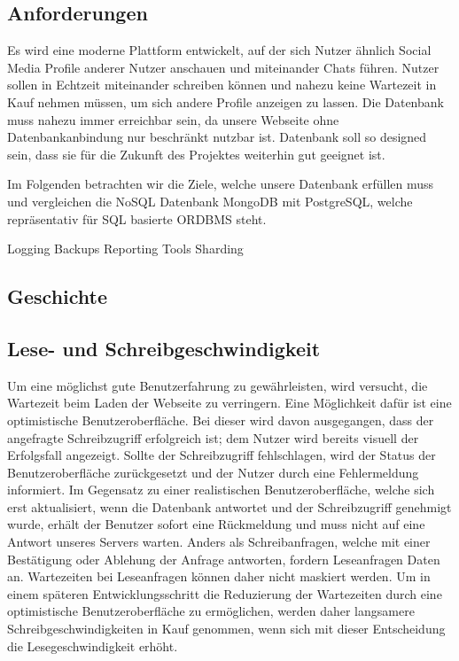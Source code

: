 \subsection{Anforderungen}
Es wird eine moderne Plattform entwickelt, auf der sich Nutzer ähnlich Social Media Profile anderer Nutzer anschauen und miteinander Chats führen. Nutzer sollen in Echtzeit miteinander schreiben können und nahezu keine Wartezeit in Kauf nehmen müssen, um sich andere Profile anzeigen zu lassen. Die Datenbank muss nahezu immer erreichbar sein, da unsere Webseite ohne Datenbankanbindung nur beschränkt nutzbar ist.
Datenbank soll so designed sein, dass sie für die Zukunft des Projektes weiterhin gut geeignet ist.


Im Folgenden betrachten wir die Ziele, welche unsere Datenbank erfüllen muss und vergleichen die NoSQL Datenbank MongoDB mit PostgreSQL, welche repräsentativ für SQL basierte ORDBMS steht.

Logging
Backups
Reporting Tools
Sharding

\subsection{Geschichte}

\subsection{Lese- und Schreibgeschwindigkeit}
Um eine möglichst gute Benutzerfahrung zu gewährleisten, wird versucht, die Wartezeit beim Laden der Webseite zu verringern. 
Eine Möglichkeit dafür ist eine optimistische Benutzeroberfläche. Bei dieser wird davon ausgegangen, dass der angefragte Schreibzugriff erfolgreich ist; dem Nutzer wird bereits visuell der Erfolgsfall angezeigt. Sollte der Schreibzugriff fehlschlagen,  wird der Status der Benutzeroberfläche zurückgesetzt und der Nutzer durch eine Fehlermeldung informiert. Im Gegensatz zu einer realistischen Benutzeroberfläche, welche sich erst aktualisiert, wenn die Datenbank antwortet und der Schreibzugriff genehmigt wurde, erhält der Benutzer sofort eine Rückmeldung und muss nicht auf eine Antwort unseres Servers warten.
Anders als Schreibanfragen, welche mit einer Bestätigung oder Ablehung der Anfrage antworten, fordern Leseanfragen Daten an. Wartezeiten bei Leseanfragen können daher nicht maskiert werden.
Um in einem späteren Entwicklungsschritt die Reduzierung der Wartezeiten durch eine optimistische Benutzeroberfläche zu ermöglichen, werden daher langsamere Schreibgeschwindigkeiten in Kauf genommen, wenn sich mit dieser Entscheidung die Lesegeschwindigkeit erhöht.

